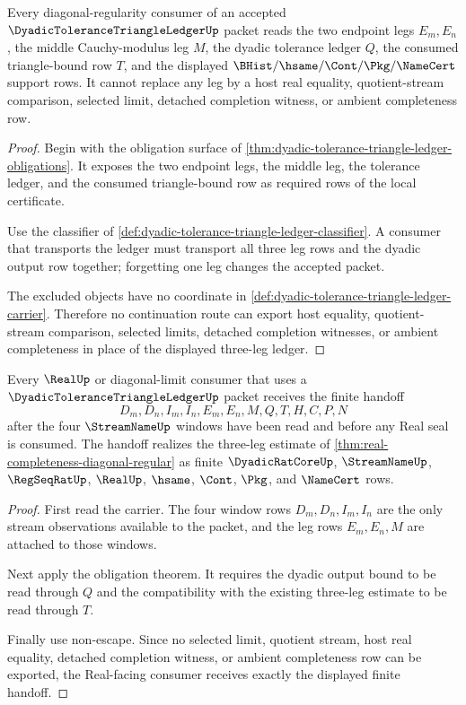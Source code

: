 \begin{theorem}
\label{thm:dyadic-tolerance-triangle-ledger-nonescape}
Every diagonal-regularity consumer of an accepted $\DyadicToleranceTriangleLedgerUp$ packet reads the two endpoint legs $E_m,E_n$, the middle Cauchy-modulus leg $M$, the dyadic tolerance ledger $Q$, the consumed triangle-bound row $T$, and the displayed $\BHist/\hsame/\Cont/\Pkg/\NameCert$ support rows. It cannot replace any leg by a host real equality, quotient-stream comparison, selected limit, detached completion witness, or ambient completeness row.
\end{theorem}
\begin{proof}
Begin with the obligation surface of \autoref{thm:dyadic-tolerance-triangle-ledger-obligations}. It exposes the two endpoint legs, the middle leg, the tolerance ledger, and the consumed triangle-bound row as required rows of the local certificate.

Use the classifier of \autoref{def:dyadic-tolerance-triangle-ledger-classifier}. A consumer that transports the ledger must transport all three leg rows and the dyadic output row together; forgetting one leg changes the accepted packet.

The excluded objects have no coordinate in \autoref{def:dyadic-tolerance-triangle-ledger-carrier}. Therefore no continuation route can export host equality, quotient-stream comparison, selected limits, detached completion witnesses, or ambient completeness in place of the displayed three-leg ledger.
\end{proof}

\begin{theorem}
\label{thm:dyadic-tolerance-triangle-ledger-window-handoff}
Every $\RealUp$ or diagonal-limit consumer that uses a $\DyadicToleranceTriangleLedgerUp$ packet receives the finite handoff
$$
D_m,D_n,I_m,I_n,E_m,E_n,M,Q,T,H,C,P,N
$$
after the four $\StreamNameUp$ windows have been read and before any Real seal is consumed. The handoff realizes the three-leg estimate of \autoref{thm:real-completeness-diagonal-regular} as finite $\DyadicRatCoreUp$, $\StreamNameUp$, $\RegSeqRatUp$, $\RealUp$, $\hsame$, $\Cont$, $\Pkg$, and $\NameCert$ rows.
\end{theorem}
\begin{proof}
First read the carrier. The four window rows $D_m,D_n,I_m,I_n$ are the only stream observations available to the packet, and the leg rows $E_m,E_n,M$ are attached to those windows.

Next apply the obligation theorem. It requires the dyadic output bound to be read through $Q$ and the compatibility with the existing three-leg estimate to be read through $T$.

Finally use non-escape. Since no selected limit, quotient stream, host real equality, detached completion witness, or ambient completeness row can be exported, the Real-facing consumer receives exactly the displayed finite handoff.
\end{proof}

